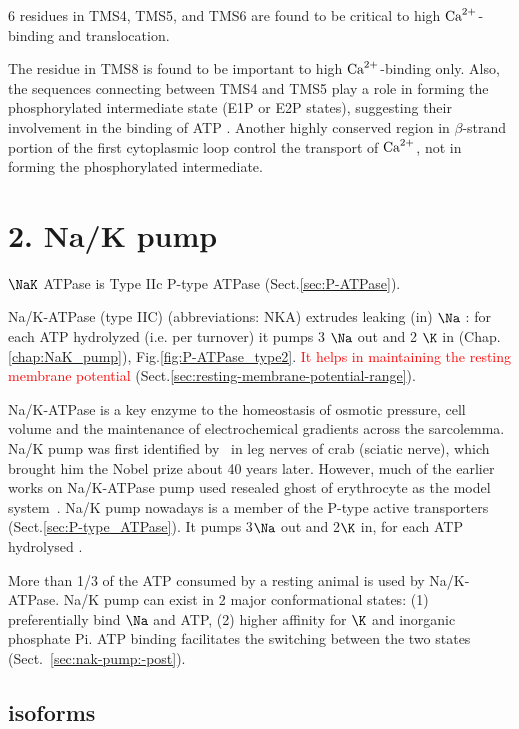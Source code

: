 6 residues in TMS4, TMS5, and TMS6 are found to be critical to high
${\text{Ca}^{2+}}$-binding and translocation. 

The residue in TMS8 is found to be important to high ${\text{Ca}^{2+}}$-binding only. Also,
the sequences connecting between TMS4 and TMS5 play a role in forming the
phosphorylated intermediate state (E1P or E2P states), suggesting their
involvement in the binding of ATP \citep{carafoli2000}. Another highly conserved
region in $\beta$-strand portion of the first cytoplasmic loop control the
transport of ${\text{Ca}^{2+}}$, not in forming the phosphorylated intermediate.



\section{2. Na/K pump}
\label{sec:NaK_pump}

$\NaK$ ATPase is Type IIc P-type ATPase (Sect.\ref{sec:P-ATPase}).

Na/K-ATPase (type IIC) (abbreviations: NKA) extrudes leaking (in) $\Na$
\citep{skou1957}: for each ATP hydrolyzed (i.e. per turnover) it pumps 3 $\Na$
out and 2 $\K$ in (Chap.\ref{chap:NaK_pump}), Fig.\ref{fig:P-ATPase_type2}.
\textcolor{red}{It helps in maintaining the resting membrane potential}
(Sect.\ref{sec:resting-membrane-potential-range}).

  

Na/K-ATPase is a key enzyme to the homeostasis of osmotic pressure, cell volume
and the maintenance of electrochemical gradients across the sarcolemma. Na/K
pump was first identified by~\citep{skou1957} in leg nerves of crab (sciatic
nerve), which brought him the Nobel prize about 40 years later. However, much of
the earlier works on Na/K-ATPase pump used resealed ghost of erythrocyte as the model
system~\citep{post1957, post1960}. Na/K pump nowadays is a member of the P-type
active transporters (Sect.\ref{sec:P-type_ATPase}).
It pumps 3$\Na$ out and 2$\K$ in, for each ATP hydrolysed \citep{post1957}.

More than 1/3 of the ATP consumed by a resting animal is used by
Na/K-ATPase.  Na/K pump can exist in 2 major conformational states:
(1) preferentially bind $\Na$ and ATP, (2) higher affinity for $\K$
and inorganic phosphate Pi. ATP binding facilitates the switching between
the two states (Sect.~\ref{sec:nak-pump:-post}).

\subsection{isoforms}
\label{sec:NaK-isoforms}

